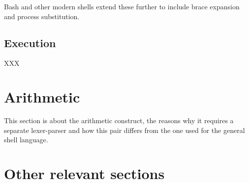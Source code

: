 Bash and other modern shells extend these further to include brace expansion and process substitution.

\subsection{Execution}

XXX



\section{Arithmetic}
This section is about the arithmetic construct, the reasons why it requires a separate lexer-parser and how this pair differs from the one used for the general shell language.



















\section{Other relevant sections}
